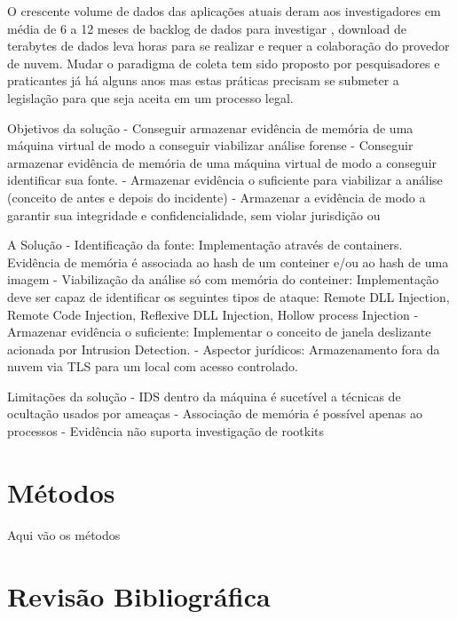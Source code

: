 \documentclass[
	12pt,				%
	openright,			%
	oneside,			%
	a4paper,			%
	english,			%
	french,				%
	spanish,			%
	brazil,				%
	]{abntex2}
\begin{document}
O crescente volume de dados das aplicações atuais deram aos investigadores em média de 6 a 12 meses de backlog de dados para investigar \cite{Quick2014}, download de terabytes
de dados leva horas para se realizar e requer a colaboração do provedor de nuvem. Mudar o paradigma de coleta tem sido proposto por pesquisadores e praticantes já há alguns
anos \cite{Birk2011}\cite{Sang2013} mas estas práticas precisam se submeter a legislação para que seja aceita em um processo legal.

Objetivos da solução
	- Conseguir armazenar evidência de memória de uma máquina virtual de modo a conseguir viabilizar análise forense
	- Conseguir armazenar evidência de memória de uma máquina virtual de modo a conseguir identificar sua fonte.
	- Armazenar evidência o suficiente para viabilizar a análise (conceito de antes e depois do incidente)
	- Armazenar a evidência de modo a garantir sua integridade e confidencialidade, sem violar jurisdição ou 

A Solução
	- Identificação da fonte: Implementação através de containers. Evidência de memória é associada ao hash de um conteiner e/ou ao hash de uma imagem
	- Viabilização da análise só com memória do conteiner: Implementação deve ser capaz de identificar os seguintes tipos de ataque: Remote DLL Injection, Remote Code Injection, Reflexive DLL Injection, Hollow process Injection
	- Armazenar evidência o suficiente: Implementar o conceito de janela deslizante acionada por Intrusion Detection.
	- Aspector jurídicos: Armazenamento fora da nuvem via TLS para um local com acesso controlado.

Limitações da solução
	- IDS dentro da máquina é sucetível a técnicas de ocultação usados por ameaças
	- Associação de memória é possível apenas ao processos
	- Evidência não suporta investigação de rootkits

\chapter{Métodos}

Aqui vão os métodos

\chapter{Revisão Bibliográfica}
\end{document}
